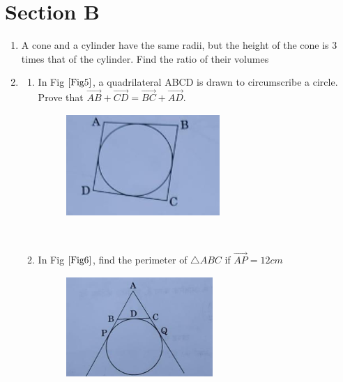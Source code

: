 \documentclass[journal,12pt,twocolumn]{IEEEtran}
\begin{document}
\section{Section B}
\begin{enumerate}[label=3.\arabic*]
    \item A cone and a cylinder have the same radii, but the height of the cone is 3 times that of the cylinder. Find the ratio of their volumes\\
    
    \item \begin{enumerate} 
    \item In Fig $\ref{Fig5}$, a quadrilateral ABCD is drawn to circumscribe a circle. Prove that $\vec{AB} + \vec{CD} = \vec{BC} + \vec{AD}$.\\
    \begin{figure}[h!]
        \centering
        \includegraphics[width=0.5\columnwidth,center]{Fig5.png}
    	\caption{}
    	\label{Fig5}
     \end{figure}
     \vspace{5cm}\\
     \item In Fig $\ref{Fig6}$, find the perimeter of $\triangle ABC$ if $\vec{AP} = 12cm$\\
    \begin{figure}[h!]
        \centering
        \includegraphics[width=0.5\columnwidth,center]{Fig6.png}
    	\caption{}
    	\label{Fig6}
     \end{figure}
     \end{enumerate}
      

\end{enumerate}
\end{document}
